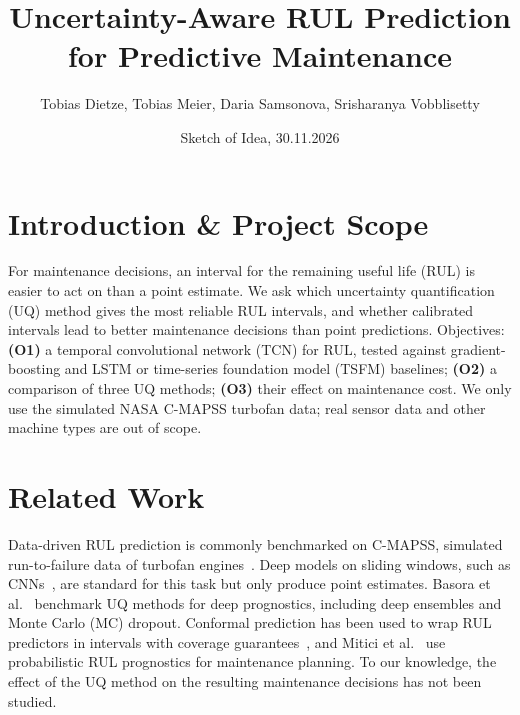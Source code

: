 \documentclass[10pt,twocolumn,a4paper]{article}
\title{Uncertainty-Aware RUL Prediction for Predictive Maintenance}
\author{Tobias Dietze, Tobias Meier, Daria Samsonova, Srisharanya Vobblisetty}
\affiliation{DHBW Mannheim / Intelligence Engineering}
\date{Sketch of Idea, 30.11.2026}
\makeatletter
\newcommand{\@affiliation}{}
\renewcommand{\maketitle}{%
  \twocolumn[{%
    \begin{center}
      {\Large\bfseries \@title\par}\vspace{0.4ex}
      {\normalsize \@author\par}\vspace{0.2ex}
      {\small \@affiliation\par}\vspace{0.2ex}
      {\small \@date\par}
    \end{center}\vspace{0.6ex}
  }]}
\makeatother
\begin{document}
\maketitle

\section{Introduction \& Project Scope}
For maintenance decisions, an interval for the remaining useful life (RUL) is easier to act on
than a point estimate. We ask which uncertainty quantification (UQ) method gives the most reliable
RUL intervals, and whether calibrated intervals lead to better maintenance decisions than point predictions.
Objectives: \textbf{(O1)} a temporal convolutional network (TCN) for RUL, tested against gradient-boosting
and LSTM or time-series foundation model (TSFM) baselines; \textbf{(O2)} a comparison of three UQ methods;
\textbf{(O3)} their effect on maintenance cost. We only use the simulated NASA C-MAPSS turbofan data;
real sensor data and other machine types are out of scope.
\section{Related Work}
Data-driven RUL prediction is commonly benchmarked on C-MAPSS, simulated run-to-failure data of
turbofan engines~\cite{4711414}. Deep models on sliding windows, such as CNNs~\cite{LI20181}, are
standard for this task but only produce point estimates. Basora et al.~\cite{BASORA2025110513}
benchmark UQ methods for deep prognostics, including deep ensembles and Monte Carlo (MC) dropout.
Conformal prediction has been used to wrap RUL predictors in intervals with coverage
guarantees~\cite{javanmardi2023conformal,robinson2026riskaware}, and Mitici et al.~\cite{MITICI2023109199}
use probabilistic RUL prognostics for maintenance planning. To our knowledge, the effect of the
UQ method on the resulting maintenance decisions has not been studied.

\end{document}

